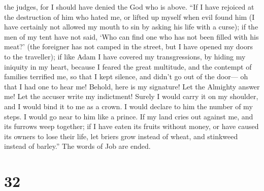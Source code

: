 the judges, for I should have denied the God who is above. 
``If I have rejoiced at the destruction of him who hated me, or lifted
up myself when evil found him  (I have certainly not
allowed my mouth to sin by asking his life with a curse); 
if the men of my tent have not said, `Who can find one who has not been
filled with his meat?'  (the foreigner has not camped in
the street, but I have opened my doors to the traveller); 
if like Adam I have covered my transgressions, by hiding my iniquity in
my heart,  because I feared the great multitude, and the
contempt of families terrified me, so that I kept silence, and didn't go
out of the door---  oh that I had one to hear me! Behold,
here is my signature! Let the Almighty answer me! Let the accuser write
my indictment!  Surely I would carry it on my shoulder, and
I would bind it to me as a crown.  I would declare to him
the number of my steps. I would go near to him like a prince.
 If my land cries out against me, and its furrows weep
together;  if I have eaten its fruits without money, or
have caused its owners to lose their life,  let briers grow
instead of wheat, and stinkweed instead of barley.'' The words of Job
are ended.

\hypertarget{section-22}{%
\section{32}\label{section-22}}

